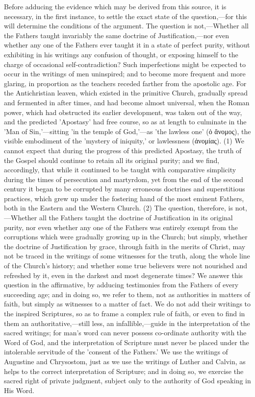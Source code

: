 \documentclass[
]{book}
\begin{document}
Before adducing the evidence which may be derived from this source, it is necessary, in the first instance, to settle the exact state of the question,---for this will determine the conditions of the argument. The question is not,---Whether all the Fathers taught invariably the same doctrine of Justification,---nor even whether any one of the Fathers ever taught it in a state of perfect purity, without exhibiting in his writings any confusion of thought, or exposing himself to the charge of occasional self-contradiction? Such imperfections might be expected to occur in the writings of men uninspired; and to become more frequent and more glaring, in proportion as the teachers receded farther from the apostolic age. For the Antichristian leaven, which existed in the primitive Church, gradually spread and fermented in after times, and had become almost universal, when the Roman power, which had obstructed its earlier development, was taken out of the way, and the predicted 'Apostasy' had free course, so as at length to culminate in the 'Man of Sin,'---sitting 'in the temple of God,'---as 'the lawless one' (ὁ ἄνομος), the visible embodiment of the 'mystery of iniquity,' or lawlessness (ἀνομίας). (1) We cannot expect that during the progress of this predicted Apostasy, the truth of the Gospel should continue to retain all its original purity; and we find, accordingly, that while it continued to be taught with comparative simplicity during the times of persecution and martyrdom, yet from the end of the second century it began to be corrupted by many erroneous doctrines and superstitious practices, which grew up under the fostering hand of the most eminent Fathers, both in the Eastern and the Western Church. (2) The question, therefore, is not,---Whether all the Fathers taught the doctrine of Justification in its original purity, nor even whether any one of the Fathers was entirely exempt from the corruptions which were gradually growing up in the Church; but simply, whether the doctrine of Justification by grace, through faith in the merits of Christ, may not be traced in the writings of some witnesses for the truth, along the whole line of the Church's history; and whether some true believers were not nourished and refreshed by it, even in the darkest and most degenerate times? We answer this question in the affirmative, by adducing testimonies from the Fathers of every succeeding age; and in doing so, we refer to them, not as authorities in matters of faith, but simply as witnesses to a matter of fact. We do not add their writings to the inspired Scriptures, so as to frame a complex rule of faith, or even to find in them an authoritative,---still less, an infallible,---guide in the interpretation of the sacred writings; for man's word can never possess co-ordinate authority with the Word of God, and the interpretation of Scripture must never be placed under the intolerable servitude of the 'consent of the Fathers.' We use the writings of Augustine and Chrysostom, just as we use the writings of Luther and Calvin, as helps to the correct interpretation of Scripture; and in doing so, we exercise the sacred right of private judgment, subject only to the authority of God speaking in His Word.
\end{document}
